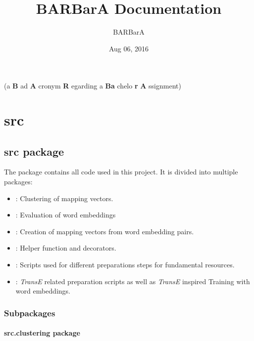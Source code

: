 \documentclass[letterpaper,10pt,english]{sphinxmanual}
\title{BARBarA Documentation}
\date{Aug 06, 2016}
\author{BARBarA}
\begin{document}
\maketitle
\tableofcontents
{}\label{index::doc}


(a \textbf{B} ad \textbf{A} cronym \textbf{R} egarding a \textbf{Ba} chelo \textbf{r} \textbf{A} ssignment)


\chapter{src}
\label{index:welcome-to-barbara-s-documentation}\label{index:src}

\section{src package}
\label{src::doc}\label{src:src-package}
The  package contains all code used in this project.
It is divided into multiple packages:
\begin{itemize}
\item {} 
: Clustering of mapping vectors.

\item {} 
: Evaluation of word embeddings

\item {} 
: Creation of mapping vectors from word embedding pairs.

\item {} 
: Helper function and decorators.

\item {} 
: Scripts used for different preparations steps for fundamental resources.

\item {} 
: \emph{TransE} related preparation scripts as well as \emph{TransE} inspired Training with word embeddings.

\end{itemize}


\subsection{Subpackages}
\label{src:subpackages}

\subsubsection{src.clustering package}
\label{src.clustering:src-clustering-package}\label{src.clustering::doc}
\end{document}
